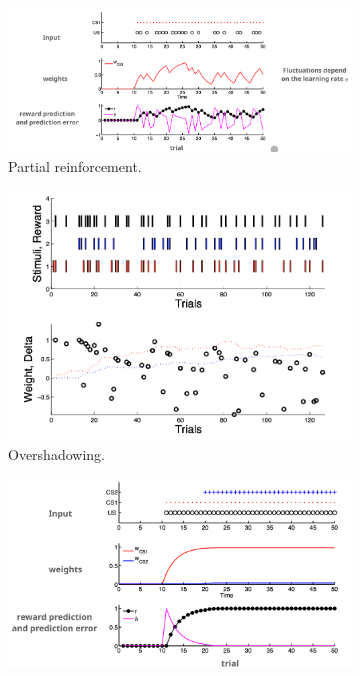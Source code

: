 \documentclass[11pt]{book} %
\begin{document}
\begin{figure}[ht]
    \begin{subfigure}[b]{0.31\textwidth}
        \centering
        \includegraphics[width=\textwidth]{./Figs/partial_exp.jpeg}
        \caption{Partial reinforcement.}
        \label{fig:blocking}
    \end{subfigure}
    \begin{subfigure}[b]{0.5\textwidth}
        \centering
        \includegraphics[width=\textwidth]{./Figs/overshadow_exp.png}
        \caption{Overshadowing.}
        \label{fig:rescorla_wagner}
    \end{subfigure}
    \begin{subfigure}[b]{0.5\textwidth}
        \centering
        \includegraphics[width=\textwidth]{./Figs/blocking_exp.jpeg}

\end{subfigure}
\end{figure}
\end{document}

